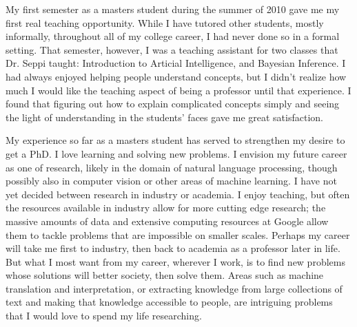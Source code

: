 \documentclass[onecolumn, 12pt]{article}
\begin{document}
My first semester as a masters student during the summer of 2010 gave me my
first real teaching opportunity.  While I have tutored other students, mostly
informally, throughout all of my college career, I had never done so in a
formal setting.  That semester, however, I was a teaching assistant for two
classes that Dr. Seppi taught: Introduction to Articial Intelligence, and
Bayesian Inference.  I had always enjoyed helping people understand concepts,
but I didn't realize how much I would like the teaching aspect of being a
professor until that experience.  I found that figuring out how to explain
complicated concepts simply and seeing the light of understanding in the
students' faces gave me great satisfaction.

My experience so far as a masters student has served to strengthen my desire to
get a PhD.  I love learning and solving new problems.  I envision my future
career as one of research, likely in the domain of natural language processing,
though possibly also in computer vision or other areas of machine learning.  I
have not yet decided between research in industry or academia.  I enjoy
teaching, but often the resources available in industry allow for more cutting
edge research; the massive amounts of data and extensive computing resources at
Google allow them to tackle problems that are impossible on smaller scales.
Perhaps my career will take me first to industry, then back to academia as a
professor later in life.  But what I most want from my career, wherever I work,
is to find new problems whose solutions will better society, then solve them.
Areas such as machine translation and interpretation, or extracting knowledge
from large collections of text and making that knowledge accessible to people,
are intriguing problems that I would love to spend my life researching.
\end{document}
